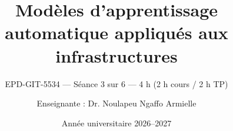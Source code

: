 
\title[EPD-GIT-5534 --- Séance 3]{Modèles d'apprentissage automatique appliqués aux infrastructures}
\subtitle{EPD-GIT-5534 --- Séance 3 sur 6 --- 4 h (2 h cours / 2 h TP)}
\author{Enseignante : Dr. Noulapeu Ngaffo Armielle}
\date{Année universitaire 2026--2027}








